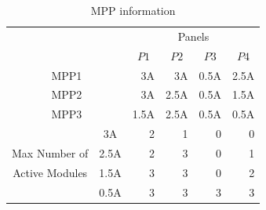 \documentclass[conference]{IEEEtran}
\begin{document}
\begin{table}[t]
\caption{MPP information}
\label{tab:approximated}
\centering
\begin{tabular}{cc|rrrr}	
\hline\hline
  &     &    	\multicolumn{4}{c}{Panels}	\\
&	&	\multicolumn{1}{c}{$P1$}	&	\multicolumn{1}{c}{$P2$}	&	\multicolumn{1}{c}{$P3$}	&	\multicolumn{1}{c}{$P4$} \\ \hline
\multicolumn{2}{c|}{MPP1}	&	3A	&	3A	&	0.5A	&	2.5A 	\\ \hline
\multicolumn{2}{c|}{MPP2}	&	3A	&	2.5A	&	0.5A	&	1.5A 	\\ \hline
\multicolumn{2}{c|}{MPP3}	&	1.5A	&	2.5A	&	0.5A	&	0.5A 	\\ \hline\hline
& 3A	&	2	&	1	&	0	&	0 	\\ \cline{2-6}
Max Number of & 2.5A	&	2	&	3	&	0	&	1 	\\ \cline{2-6}
Active Modules & 1.5A	&	3	&	3	&	0	&	2 	\\ \cline{2-6}
& 0.5A	&	3	&	3	&	3	&	3 	\\ \hline
\end{tabular}
\end{table}

%
\end{document}
